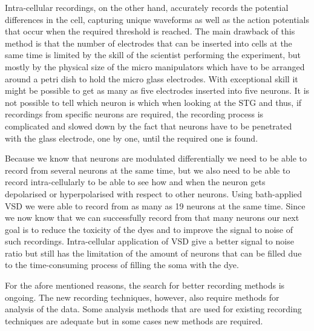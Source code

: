 Intra-cellular recordings, on the other hand, accurately records the potential differences in the cell, capturing unique waveforms as well as the action potentials that occur when the required threshold is reached. The main drawback of this method is that the number of electrodes that can be inserted into cells at the same time is limited by the skill of the scientist performing the experiment, but mostly by the physical size of the micro manipulators which have to be arranged around a petri dish to hold the micro glass electrodes. With exceptional skill it might be possible to get as many as five electrodes inserted into five neurons. It is not possible to tell which neuron is which when looking at the \ac{STG} and thus, if recordings from specific neurons are required, the recording process is complicated and slowed down by the fact that neurons have to be penetrated with the glass electrode, one by one, until the required one is found.

Because we know that neurons are modulated differentially we need to be able to record from several neurons at the same time, but we also need to be able to record intra-cellularly to be able to see how and when the neuron gets depolarised or hyperpolarised with respect to other neurons. Using bath-applied \ac{VSD} we were able to record from as many as 19 neurons at the same time. Since we now know that we can successfully record from that many neurons our next goal is to reduce the toxicity of the dyes and to improve the signal to noise of such recordings. Intra-cellular application of \ac{VSD} give a better signal to noise ratio but still has the limitation of the amount of neurons that can be filled due to the time-consuming process of filling the soma with the dye.

For the afore mentioned reasons, the search for better recording methods is ongoing. The new recording techniques, however, also require methods for analysis of the data. Some analysis methods that are used for existing recording techniques are adequate but in some cases new methods are required.


